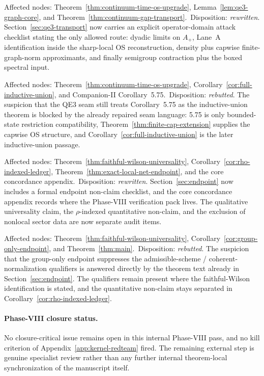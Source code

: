 \begin{description}[leftmargin=2.2em,style=nextline]
\item[OP-01 -- hidden domain argument.] Affected nodes: Theorem~\ref{thm:continuum-time-os-upgrade}, Lemma~\ref{lem:qe3-graph-core}, and Theorem~\ref{thm:continuum-gap-transport}.\
Disposition: \emph{rewritten}. Section~\ref{sec:qe3-transport} now carries an explicit operator-domain attack checklist stating the only allowed route: dyadic limits on $A_+$, Lane~A identification inside the sharp-local OS reconstruction, density plus capwise finite-graph-norm approximants, and finally semigroup contraction plus the boxed spectral input.

\item[OP-02 -- false citation.] Affected nodes: Theorem~\ref{thm:continuum-time-os-upgrade}, Corollary~\ref{cor:full-inductive-union}, and Companion-II Corollary~5.75.\
Disposition: \emph{rebutted}. The suspicion that the QE3 seam still treats Corollary~5.75 as the inductive-union theorem is blocked by the already repaired seam language: 5.75 is only bounded-state restriction compatibility, Theorem~\ref{thm:finite-cap-extension} supplies the capwise OS structure, and Corollary~\ref{cor:full-inductive-union} is the later inductive-union passage.

\item[EP-01 -- claim overstatement.] Affected nodes: Theorem~\ref{thm:faithful-wilson-universality}, Corollary~\ref{cor:rho-indexed-ledger}, Theorem~\ref{thm:exact-local-net-endpoint}, and the core concordance appendix.\
Disposition: \emph{rewritten}. Section~\ref{sec:endpoint} now includes a formal endpoint non-claim checklist, and the core concordance appendix records where the Phase-VIII verification pack lives. The qualitative universality claim, the $\rho$-indexed quantitative non-claim, and the exclusion of nonlocal sector data are now separate audit items.

\item[EP-02 -- claim overstatement.] Affected nodes: Theorem~\ref{thm:faithful-wilson-universality}, Corollary~\ref{cor:group-only-endpoint}, and Theorem~\ref{thm:main}.\
Disposition: \emph{rebutted}. The suspicion that the group-only endpoint suppresses the admissible-scheme / coherent-normalization qualifiers is answered directly by the theorem text already in Section~\ref{sec:endpoint}. The qualifiers remain present where the faithful-Wilson identification is stated, and the quantitative non-claim stays separated in Corollary~\ref{cor:rho-indexed-ledger}.
\end{description}

\paragraph{Phase-VIII closure status.}
No closure-critical issue remains open in this internal Phase-VIII pass, and no kill criterion of Appendix~\ref{app:kernel-redteam} fired. The remaining external step is genuine specialist review rather than any further internal theorem-local synchronization of the manuscript itself.
